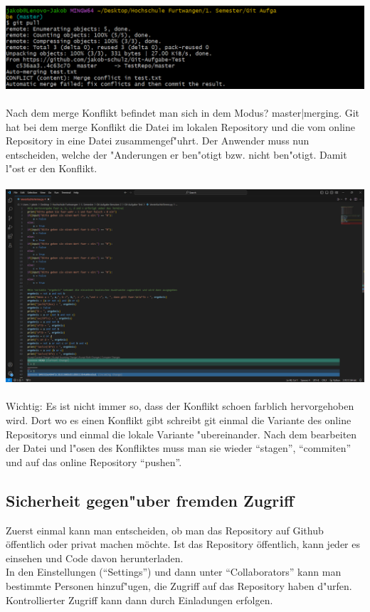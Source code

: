 \documentclass[a4paper,11pt,titlepage]{article}
\begin{document}
\\
\includegraphics[width = 13 cm]{git_merge_konflikt.png}\\
\\
Nach dem merge Konflikt befindet man sich in dem Modus? master|merging. Git hat bei dem merge Konflikt die Datei im lokalen Repository und die vom online Repository in eine Datei zusammengef"uhrt. Der Anwender muss nun entscheiden, welche der "Anderungen er ben"otigt bzw. nicht ben"otigt. Damit l"ost er den Konflikt.\\
\\
\includegraphics[width = 13 cm]{Loesen_des_Konflikts.png}\\
\\
Wichtig: Es ist nicht immer so, dass der Konflikt schoen farblich hervorgehoben wird. Dort wo es einen Konflikt gibt schreibt git einmal die Variante des online Repositorys und einmal die lokale Variante "ubereinander. Nach dem bearbeiten der Datei und l"osen des Konfliktes muss man sie wieder "`stagen"', "`commiten"' und auf das online Repository "`pushen"'.
 
\subsection{Sicherheit gegen"uber fremden Zugriff}
Zuerst einmal kann man entscheiden, ob man das Repository auf Github öffentlich oder privat machen möchte. Ist das Repository öffentlich, kann jeder es einsehen und Code davon herunterladen.\\
In den Einstellungen ("`Settings"') und dann unter "`Collaborators"' kann man bestimmte Personen hinzuf"ugen, die Zugriff auf das Repository haben d"urfen. 
Kontrollierter Zugriff kann dann durch Einladungen erfolgen.
\end{document}
